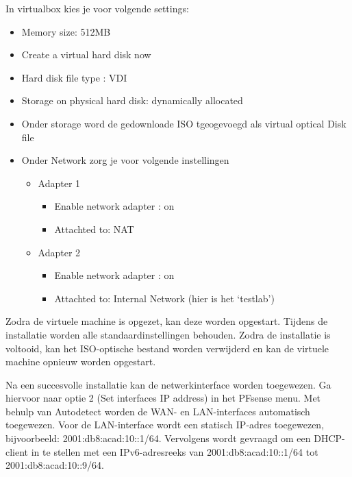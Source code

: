 In virtualbox kies je voor volgende settings:
\begin{itemize}
    \item Memory size: 512MB 
    \item Create a virtual hard disk now
    \item Hard disk file type : VDI
    \item Storage on physical hard disk: dynamically allocated
    \item Onder storage word de gedownloade ISO tgeogevoegd als virtual optical Disk file
    \item Onder Network zorg je voor volgende instellingen
        \begin{itemize}
            \item Adapter 1
            \begin{itemize}
                \item Enable network adapter : on
                \item Attachted to: NAT
                
            \end{itemize}
        \end{itemize}
        \begin{itemize}
            \item Adapter 2
            \begin{itemize}
                \item Enable network adapter : on
                \item Attachted to: Internal Network (hier is het ‘testlab’)
                
            \end{itemize}
        \end{itemize}
    
\end{itemize}
Zodra de virtuele machine is opgezet, kan deze worden opgestart. Tijdens de installatie worden alle standaardinstellingen behouden. Zodra de installatie is voltooid, kan het ISO-optische bestand worden verwijderd en kan de virtuele machine opnieuw worden opgestart.
\newline

Na een succesvolle installatie kan de netwerkinterface worden toegewezen. Ga hiervoor naar optie 2 (Set interfaces IP address) in het PFsense menu. Met behulp van Autodetect worden de WAN- en LAN-interfaces automatisch toegewezen. Voor de LAN-interface wordt een statisch IP-adres toegewezen, bijvoorbeeld: 2001:db8:acad:10::1/64. Vervolgens wordt gevraagd om een DHCP-client in te stellen met een IPv6-adresreeks van 2001:db8:acad:10::1/64 tot 2001:db8:acad:10::9/64.
\newline

